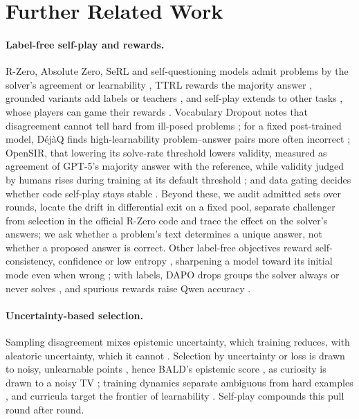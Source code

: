 \FloatBarrier
\section{Further Related Work}
\label{app:related}

\paragraph{Label-free self-play and rewards.} R-Zero, Absolute Zero, SeRL and self-questioning models admit problems by the solver's agreement or learnability \citep{huang2026rzero,zhao2025absolute,fang2025serl,chen2025sqlm}, TTRL rewards the majority answer \citep{zuo2025ttrl}, grounded variants add labels or teachers \citep{yu2025rfew,sundaram2026soar}, and self-play extends to other tasks \citep{yang2026spell,huang2026gzero,yu2026chase,cowsik2026selfplay}, whose players can game their rewards \citep{bailey2026sgs,zhou2026convincing}. Vocabulary Dropout notes that disagreement cannot tell hard from ill-posed problems \citep{dineen2026vocabulary}; for a fixed post-trained model, D\'ej\`aQ finds high-learnability problem--answer pairs more often incorrect \citep{ropke2026dejaq}; OpenSIR, that lowering its solve-rate threshold lowers validity, measured as agreement of GPT-5's majority answer with the reference, while validity judged by humans rises during training at its default threshold \citep{kwan2025opensir}; and data gating decides whether code self-play stays stable \citep{pu2026survive}. Beyond these, we audit admitted sets over rounds, locate the drift in differential exit on a fixed pool, separate challenger from selection in the official R-Zero code and trace the effect on the solver's answers; we ask whether a problem's text determines a unique answer, not whether a proposed answer is correct. Other label-free objectives reward self-consistency, confidence or low entropy \citep{huang2023lmsi,prasad2025scpo,zhao2026intuitor,prabhudesai2025rent,zhang2025empo,agarwal2025entropy}, sharpening a model toward its initial mode even when wrong \citep{huang2025sharpening,he2026howfar,shafayat2025srt}; with labels, DAPO drops groups the solver always or never solves \citep{yu2025dapo}, and spurious rewards raise Qwen accuracy \citep{shao2026spurious}.

\paragraph{Uncertainty-based selection.} Sampling disagreement \citep{wang2023selfconsistency,kuhn2023semantic,farquhar2024semantic} mixes epistemic uncertainty, which training reduces, with aleatoric uncertainty, which it cannot \citep{kendall2017uncertainties,hullermeier2021aleatoric}. Selection by uncertainty or loss is drawn to noisy, unlearnable points \citep{karamcheti2021outliers,mindermann2022rholoss}, hence BALD's epistemic score \citep{houlsby2011bald}, as curiosity is drawn to a noisy TV \citep{burda2019curiosity}; training dynamics separate ambiguous from hard examples \citep{swayamdipta2020cartography}, and curricula target the frontier of learnability \citep{bengio2009curriculum,jiang2021plr,dennis2020paired}. Self-play compounds this pull round after round.

